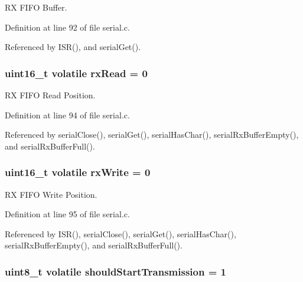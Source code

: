 R\-X F\-I\-F\-O Buffer. 



Definition at line 92 of file serial.\-c.



Referenced by I\-S\-R(), and serial\-Get().

\hypertarget{group__uart_ga9ec81baf5fa44701fbe03f942171b5e6}{
\subsubsection[{rx\-Read}]{\setlength{\rightskip}{0pt plus 5cm}uint16\-\_\-t volatile rx\-Read = 0}}\label{group__uart_ga9ec81baf5fa44701fbe03f942171b5e6}


R\-X F\-I\-F\-O Read Position. 



Definition at line 94 of file serial.\-c.



Referenced by serial\-Close(), serial\-Get(), serial\-Has\-Char(), serial\-Rx\-Buffer\-Empty(), and serial\-Rx\-Buffer\-Full().

\hypertarget{group__uart_ga6428d84da0f4255131fef945c27af689}{
\subsubsection[{rx\-Write}]{\setlength{\rightskip}{0pt plus 5cm}uint16\-\_\-t volatile rx\-Write = 0}}\label{group__uart_ga6428d84da0f4255131fef945c27af689}


R\-X F\-I\-F\-O Write Position. 



Definition at line 95 of file serial.\-c.



Referenced by I\-S\-R(), serial\-Close(), serial\-Get(), serial\-Has\-Char(), serial\-Rx\-Buffer\-Empty(), and serial\-Rx\-Buffer\-Full().

\hypertarget{group__uart_ga7f9fb8e4a004459dd017ce8383fa65ff}{
\subsubsection[{should\-Start\-Transmission}]{\setlength{\rightskip}{0pt plus 5cm}uint8\-\_\-t volatile should\-Start\-Transmission = 1}}\label{group__uart_ga7f9fb8e4a004459dd017ce8383fa65ff}



